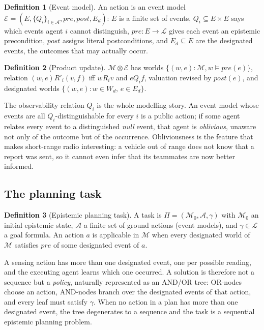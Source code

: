 \documentclass[11pt,a4paper]{article}
\theoremstyle{definition}
\newtheorem{definition}{Definition}
\newcommand{\Ag}{\mathcal{A}}
\newcommand{\Mod}{\mathcal{M}}
\newcommand{\Ev}{\mathcal{E}}
\newcommand{\prd}{\otimes}
\begin{document}
\begin{definition}[Event model]
An action is an event model $\Ev = (E, \{Q_i\}_{i\in\Ag}, \mathit{pre},
\mathit{post}, E_d)$: $E$ is a finite set of events, $Q_i\subseteq E\times E$
says which events agent $i$ cannot distinguish, $\mathit{pre}: E\to\mathcal{L}$
gives each event an epistemic precondition, $\mathit{post}$ assigns literal
postconditions, and $E_d\subseteq E$ are the designated events, the outcomes
that may actually occur.
\end{definition}

\begin{definition}[Product update]
$\Mod\prd\Ev$ has worlds $\{(w,e) : \Mod,w\models \mathit{pre}(e)\}$, relation
$(w,e)\mathrel{R'_i}(v,f)$ iff $w\mathrel{R_i}v$ and $e\mathrel{Q_i}f$,
valuation revised by $\mathit{post}(e)$, and designated worlds
$\{(w,e) : w\in W_d,\, e\in E_d\}$.
\end{definition}

The observability relation $Q_i$ is the whole modelling story. An event model
whose events are all $Q_i$-distinguishable for every $i$ is a public action; if
some agent relates every event to a distinguished \emph{null} event, that agent
is \emph{oblivious}, unaware not only of the outcome but of the occurrence.
Obliviousness is the feature that makes short-range radio interesting: a
vehicle out of range does not know that a report was sent, so it cannot even
infer that its teammates are now better informed.

\subsection{The planning task}

\begin{definition}[Epistemic planning task]
A task is $\Pi = (\Mod_0, \mathcal{A}, \gamma)$ with $\Mod_0$ an initial
epistemic state, $\mathcal{A}$ a finite set of ground actions (event models),
and $\gamma\in\mathcal{L}$ a goal formula. An action $a$ is applicable in
$\Mod$ when every designated world of $\Mod$ satisfies $\mathit{pre}$ of some
designated event of $a$.
\end{definition}

A sensing action has more than one designated event, one per possible
reading, and the executing agent learns which one occurred. A solution is
therefore not a sequence but a \emph{policy}, naturally represented as an
AND/OR tree: OR-nodes choose an action, AND-nodes branch over the designated
events of that action, and every leaf must satisfy $\gamma$. When no action in
a plan has more than one designated event, the tree degenerates to a sequence
and the task is a sequential epistemic planning problem.
\end{document}

